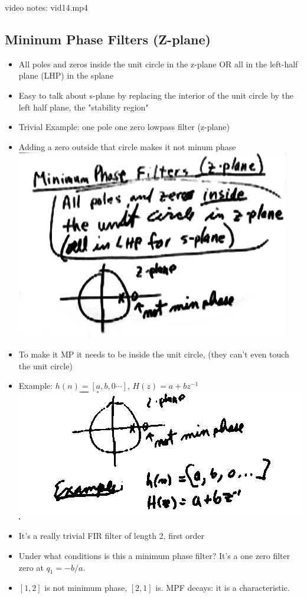 video notes: vid14.mp4
\subsection*{Mininum Phase Filters (Z-plane)}
\begin{itemize}
\item{All poles and zeros inside the unit circle in the z-plane 
OR all in the left-half plane (LHP) in the splane}
\item{Easy to talk about s-plane by replacing the interior of the unit circle by
the left half plane, the "stability region"}

\item{
Trivial Example: one pole one zero lowpass filter (z-plane)
}
\item{
    Adding a zero outside that circle makes it not minum phase
    \includegraphics[scale=0.4]{frames/23a}
}
\item{
    To make it MP it needs to be inside the unit circle, (they can't even
touch the unit circle)
}


\item{
Example:  $h(n) = [a, b, 0\cdots]$, $H(z) = a + bz^{-1}$
    \includegraphics[scale=0.4]{frames/23b}

}
\item{
It's a really trivial FIR filter of length 2, first order
}
\item{
Under what conditions is this a minimum phase filter? It's a one
zero filter zero at $q_1 = -b/a$.
}
\item{
$[1, 2]$ is not minimum phase, $[2, 1]$ is. MPF decays: it is a characteristic.
}
\end{itemize}

